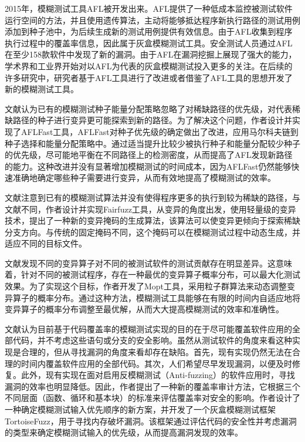 \documentclass[master]{thesis-uestc}
\begin{document}
2015年，模糊测试工具AFL被开发出来。AFL提供了一种低成本监控被测试软件运行空间的方法，并且使用遗传算法，主动将能够抵达程序新执行路径的测试用例添加到种子池中，为后续生成新的测试用例提供有效信息。由于AFL收集到程序执行过程中的覆盖率信息，因此属于灰盒模糊测试工具。安全测试人员通过AFL在至少158款软件中发现了新的漏洞。由于AFL在漏洞挖掘上展现了强大的能力，学术界和工业界开始对以AFL为代表的灰盒模糊测试投入更多的关注。在后续的许多研究中，研究者基于AFL工具进行了改进或者借鉴了AFL工具的思想开发了新的模糊测试工具。

文献\cite{bohme2017coverage}认为已有的模糊测试种子能量分配策略忽略了对稀缺路径的优先级，对代表稀缺路径的种子进行变异更可能探索到新的路径。为了解决这个问题，作者设计并实现了AFLFast工具，AFLFast对种子优先级的确定做出了改进，应用马尔科夫链到种子选择和能量分配策略中。通过适当提升比较少被执行种子和能量分配较少种子的优先级，尽可能地平衡在不同路径上的检测密度，从而提高了AFL发现新路径的能力。这种改进并没有显著增加模糊测试的时间成本，因为AFLFast仍然能够快速准确地确定哪些种子需要进行变异，从而有效地提高了模糊测试的效率。

文献\cite{lemieux2018fairfuzz}注意到已有的模糊测试算法并没有使得程序更多的执行到较为稀缺的路径，与文献\cite{bohme2017coverage}不同，作者设计并实现Fairfuzz工具，从变异的角度出发，使用轻量级的变异技术，提出了一种新的变异掩码的生成算法，该算法可以使变异更倾向于探索稀缺分支方向。与传统的固定掩码不同，这个掩码可以在模糊测试过程中动态生成，并适应不同的目标文件。

文献\cite{lyu2019mopt}发现不同的变异算子对不同的被测试软件的测试贡献存在明显差异。这意味着，针对不同的被测试程序，存在一种最优的变异算子概率分布，可以最大化测试效果。为了实现这个目标，作者开发了Mopt工具，采用粒子群算法来动态调整变异算子的概率分布。通过这种方法，模糊测试工具能够在有限的时间内自适应地将变异算子的概率分布调整至最优解，从而大大提高模糊测试的效率和准确性。

文献\cite{wang2020not}认为目前基于代码覆盖率的模糊测试实现的目的在于尽可能覆盖软件应用的全部代码，并不考虑这些语句或分支的安全影响。虽然从测试软件的角度来看这种实现是合理的，但从寻找漏洞的角度来看却存在缺陷。首先，现有实现仍然无法在合理的时间内覆盖软件应用的全部代码。其次，人们希望尽早发现漏洞，以便及时修复。此外，现有实现在面对启用反模糊测试（Anti-fuzzing）的软件应用时，寻找漏洞的效率也明显降低。因此，作者提出了一种新的覆盖率审计方法，它根据三个不同层面（函数、循环和基本块）的标准来评估覆盖率对安全的影响。作者设计了一种确定模糊测试输入优先顺序的新方案，并开发了一个灰盒模糊测试框架TortoiseFuzz，用于寻找内存破坏漏洞。该框架通过评估代码的安全性并考虑漏洞的类型来确定模糊测试输入的优先级，从而提高漏洞发现的效率。
\end{document}
